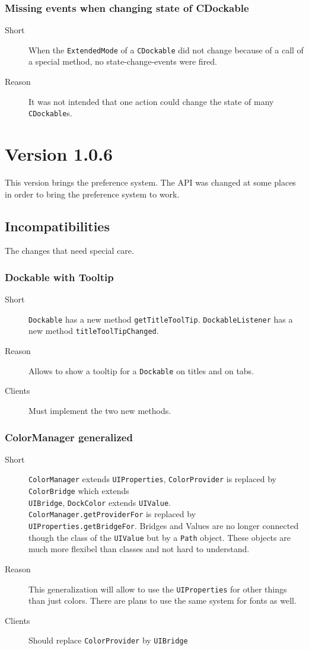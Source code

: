 \documentclass[a4paper,10pt]{article}
\newcommand{\src}[1]{\lstinline[basicstyle=\normalsize\ttfamily,keywordstyle=\normalsize\ttfamily,identifierstyle=\normalsize\ttfamily]|#1|}
\newcommand{\short}{\item[Short]}
\newcommand{\why}{\item[Reason]}
\newcommand{\clients}{\item[Clients]}
\begin{document}
\subsubsection{Missing events when changing state of CDockable}
\begin{description}
 \short When the \src{ExtendedMode} of a \src{CDockable} did not change because of a call of a special method, no state-change-events were fired.
 \why It was not intended that one action could change the state of many \src{CDockable}s.
\end{description}

\section{Version 1.0.6}
This version brings the preference system. The API was changed at some places in order to bring the preference system to work.

\subsection{Incompatibilities}
The changes that need special care.

\subsubsection{Dockable with Tooltip}
\begin{description}
 \short \src{Dockable} has a new method \src{getTitleToolTip}. \src{DockableListener} has a new method \src{titleToolTipChanged}.
 \why Allows to show a tooltip for a \src{Dockable} on titles and on tabs.
 \clients Must implement the two new methods.
\end{description}

\subsubsection{ColorManager generalized}
\begin{description}
 \short \src{ColorManager} extends \src{UIProperties}, \src{ColorProvider} is replaced by \src{ColorBridge} which extends \\\src{UIBridge}, \src{DockColor} extends \src{UIValue}. \\\src{ColorManager.getProviderFor} is replaced by \\\src{UIProperties.getBridgeFor}. Bridges and Values are no longer connected though the class of the \src{UIValue} but by a \src{Path} object. These objects are much more flexibel than classes and not hard to understand.
 \why This generalization will allow to use the \src{UIProperties} for other things than just colors. There are plans to use the same system for fonts as well.
 \clients Should replace \src{ColorProvider} by \src{UIBridge}
\end{description}
\end{document}
